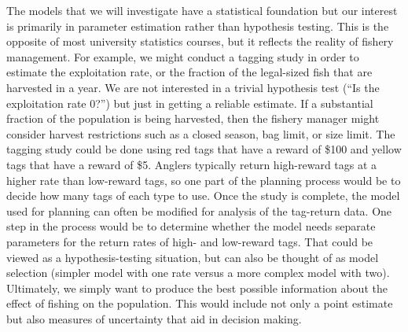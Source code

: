 \documentclass[
]{krantz}
\begin{document}
The models that we will investigate have a statistical foundation but our interest is primarily in parameter estimation rather than hypothesis testing. This is the opposite of most university statistics courses, but it reflects the reality of fishery management. For example, we might conduct a tagging study in order to estimate the exploitation rate, or the fraction of the legal-sized fish that are harvested in a year. We are not interested in a trivial hypothesis test (``Is the exploitation rate 0?'') but just in getting a reliable estimate. If a substantial fraction of the population is being harvested, then the fishery manager might consider harvest restrictions such as a closed season, bag limit, or size limit. The tagging study could be done using red tags that have a reward of \$100 and yellow tags that have a reward of \$5. Anglers typically return high-reward tags at a higher rate than low-reward tags, so one part of the planning process would be to decide how many tags of each type to use. Once the study is complete, the model used for planning can often be modified for analysis of the tag-return data. One step in the process would be to determine whether the model needs separate parameters for the return rates of high- and low-reward tags. That could be viewed as a hypothesis-testing situation, but can also be thought of as model selection (simpler model with one rate versus a more complex model with two). Ultimately, we simply want to produce the best possible information about the effect of fishing on the population. This would include not only a point estimate but also measures of uncertainty that aid in decision making.
\end{document}

